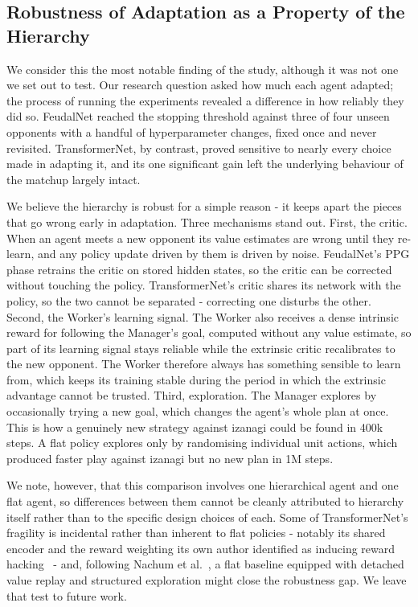 \documentclass[sigconf,review=false]{acmart}
\begin{document}
\subsection{Robustness of Adaptation as a Property of the Hierarchy}
We consider this the most notable finding of the study, although it was not one we set out to test. 
Our research question asked how much each agent adapted; the process of running the experiments revealed a difference in how reliably they did so. 
FeudalNet reached the stopping threshold against three of four unseen opponents with a handful of hyperparameter changes, fixed once and never revisited.
TransformerNet, by contrast, proved sensitive to nearly every choice made in adapting it, and its one significant gain left the underlying behaviour of the matchup largely intact.

We believe the hierarchy is robust for a simple reason - it keeps apart the pieces that go wrong early in adaptation. 
Three mechanisms stand out. 
First, the critic. 
When an agent meets a new opponent its value estimates are wrong until they re-learn, and any policy update driven by them is driven by noise. FeudalNet's PPG phase retrains the critic on stored hidden states, so the critic can be corrected without touching the policy. 
TransformerNet's critic shares its network with the policy, so the two cannot be separated - correcting one disturbs the other. 
Second, the Worker's learning signal. The Worker also receives a dense intrinsic reward for following the Manager's goal, computed without any value estimate, so part of its learning signal stays reliable while the extrinsic critic recalibrates to the new opponent. 
The Worker therefore always has something sensible to learn from, which keeps its training stable during the period in which the extrinsic advantage cannot be trusted. 
Third, exploration. 
The Manager explores by occasionally trying a new goal, which changes the agent's whole plan at once. 
This is how a genuinely new strategy against izanagi could be found in 400k steps. 
A flat policy explores only by randomising individual unit actions, which produced faster play against izanagi but no new plan in 1M steps.

We note, however, that this comparison involves one hierarchical agent and one flat agent, so differences between them cannot be cleanly attributed to hierarchy itself rather than to the specific design choices of each.
Some of TransformerNet's fragility is incidental rather than inherent to flat policies - notably its shared encoder and the reward weighting its own author identified as inducing reward hacking~\cite{transformernet} - and, following Nachum et al.~\cite{badhrl}, a flat baseline equipped with detached value replay and structured exploration might close the robustness gap.
We leave that test to future work.
\end{document}
